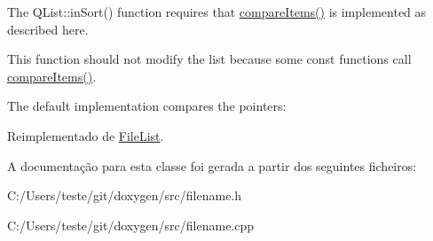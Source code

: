 The Q\-List\-::in\-Sort() function requires that \hyperlink{class_file_name_a219450accf048597ffc7113ecde4c402}{compare\-Items()} is implemented as described here.

This function should not modify the list because some const functions call \hyperlink{class_file_name_a219450accf048597ffc7113ecde4c402}{compare\-Items()}.

The default implementation compares the pointers\-: 
\begin{DoxyCode}
\end{DoxyCode}
 

Reimplementado de \hyperlink{class_file_list_a219450accf048597ffc7113ecde4c402}{File\-List}.



A documentação para esta classe foi gerada a partir dos seguintes ficheiros\-:\begin{DoxyCompactItemize}
\item 
C\-:/\-Users/teste/git/doxygen/src/filename.\-h\item 
C\-:/\-Users/teste/git/doxygen/src/filename.\-cpp\end{DoxyCompactItemize}
